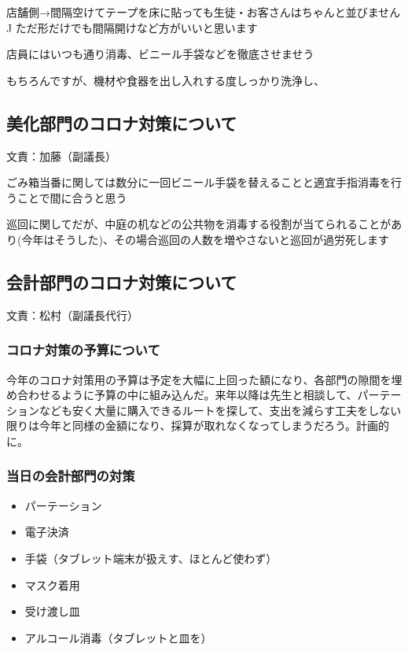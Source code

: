 \documentclass[dvipdfmx,jb5]{jarticle}
\begin{document}
店舗側→間隔空けてテープを床に貼っても生徒・お客さんはちゃんと並びません^^

ただ形だけでも間隔開けなど方がいいと思います

店員にはいつも通り消毒、ビニール手袋などを徹底させませう

もちろんですが、機材や食器を出し入れする度しっかり洗浄し、


\subsection{美化部門のコロナ対策について} 文責：加藤（副議長） \vspace{2mm}

ごみ箱当番に関しては数分に一回ビニール手袋を替えることと適宜手指消毒を行うことで間に合うと思う

巡回に関してだが、中庭の机などの公共物を消毒する役割が当てられることがあり(今年はそうした)、その場合巡回の人数を増やさないと巡回が過労死します

\subsection{会計部門のコロナ対策について} 文責：松村（副議長代行） \vspace{2mm}
\subsubsection{コロナ対策の予算について}
今年のコロナ対策用の予算は予定を大幅に上回った額になり、各部門の隙間を埋め合わせるように予算の中に組み込んだ。来年以降は先生と相談して、パーテーションなども安く大量に購入できるルートを探して、支出を減らす工夫をしない限りは今年と同様の金額になり、採算が取れなくなってしまうだろう。計画的に。

\subsubsection{当日の会計部門の対策}
\begin{itemize}
  \item パーテーション
  \item 電子決済
  \item 手袋（タブレット端末が扱えす、ほとんど使わず）
  \item マスク着用
  \item 受け渡し皿
  \item アルコール消毒（タブレットと皿を）
\end{itemize}
\end{document}
